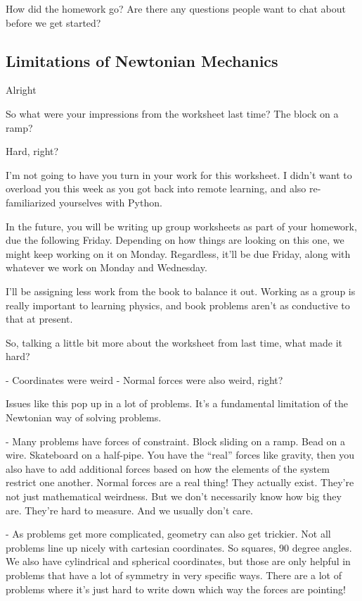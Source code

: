 \documentclass[10pt]{article}
\begin{document}
How did the homework go? Are there any questions people want to chat about before we get started?

\subsection*{Limitations of Newtonian Mechanics}

Alright

So what were your impressions from the worksheet last time? The block on a ramp?

Hard, right? 

I'm not going to have you turn in your work for this worksheet. I didn't want to overload you this week as you got back into remote learning, and also re-familiarized yourselves with Python.

In the future, you will be writing up group worksheets as part of your homework, due the following Friday. Depending on how things are looking on this one, we might keep working on it on Monday. Regardless, it'll be due Friday, along with whatever we work on Monday and Wednesday. 

I'll be assigning less work from the book to balance it out. Working as a group is really important to learning physics, and book problems aren't as conductive to that at present. 

So, talking a little bit more about the worksheet from last time, what made it hard?

- Coordinates were weird
- Normal forces were also weird, right? 

Issues like this pop up in a lot of problems. It's a fundamental limitation of the Newtonian way of solving problems. 

- Many problems have forces of constraint. Block sliding on a ramp. Bead on a wire. Skateboard on a half-pipe. You have the ``real'' forces like gravity, then you also have to add additional forces based on how the elements of the system restrict one another. Normal forces are a real thing! They actually exist. They're not just mathematical weirdness. But we don't necessarily know how big they are. They're hard to measure. And we usually don't care. 

- As problems get more complicated, geometry can also get trickier. Not all problems line up nicely with cartesian coordinates. So squares, 90 degree angles. We also have cylindrical and spherical coordinates, but those are only helpful in problems that have a lot of symmetry in very specific ways. There are a lot of problems where it's just hard to write down which way the forces are pointing!
\end{document}
